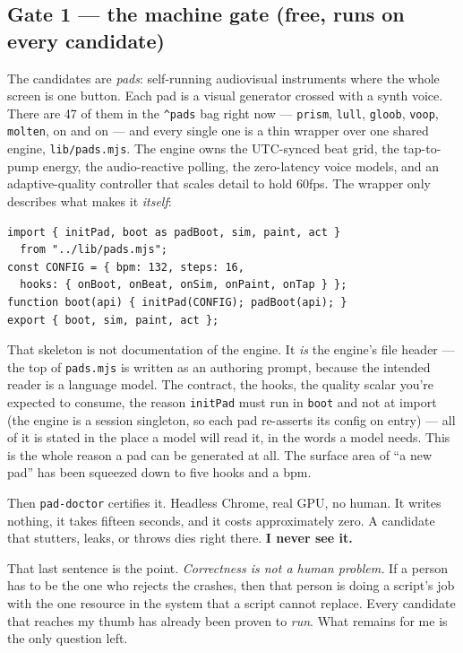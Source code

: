 \documentclass[10pt,letterpaper,twocolumn]{article}
\begin{document}
\subsection{Gate 1 --- the machine gate (free, runs on every candidate)}

The candidates are \emph{pads}: self-running audiovisual instruments where the whole screen is one button. Each pad is a visual generator crossed with a synth voice. There are 47 of them in the \texttt{\^{}pads} bag right now --- \texttt{prism}, \texttt{lull}, \texttt{gloob}, \texttt{voop}, \texttt{molten}, on and on --- and every single one is a thin wrapper over one shared engine, \texttt{lib/pads.mjs}. The engine owns the UTC-synced beat grid, the tap-to-pump energy, the audio-reactive polling, the zero-latency voice models, and an adaptive-quality controller that scales detail to hold 60fps. The wrapper only describes what makes it \emph{itself}:

\begin{lstlisting}
import { initPad, boot as padBoot, sim, paint, act }
  from "../lib/pads.mjs";
const CONFIG = { bpm: 132, steps: 16,
  hooks: { onBoot, onBeat, onSim, onPaint, onTap } };
function boot(api) { initPad(CONFIG); padBoot(api); }
export { boot, sim, paint, act };
\end{lstlisting}

That skeleton is not documentation of the engine. It \emph{is} the engine's file header --- the top of \texttt{pads.mjs} is written as an authoring prompt, because the intended reader is a language model. The contract, the hooks, the quality scalar you're expected to consume, the reason \texttt{initPad} must run in \texttt{boot} and not at import (the engine is a session singleton, so each pad re-asserts its config on entry) --- all of it is stated in the place a model will read it, in the words a model needs. This is the whole reason a pad can be generated at all. The surface area of ``a new pad'' has been squeezed down to five hooks and a bpm.

Then \texttt{pad-doctor} certifies it. Headless Chrome, real GPU, no human. It writes nothing, it takes fifteen seconds, and it costs approximately zero. A candidate that stutters, leaks, or throws dies right there. \textbf{I never see it.}

That last sentence is the point. \emph{Correctness is not a human problem.} If a person has to be the one who rejects the crashes, then that person is doing a script's job with the one resource in the system that a script cannot replace. Every candidate that reaches my thumb has already been proven to \emph{run}. What remains for me is the only question left.
\end{document}

